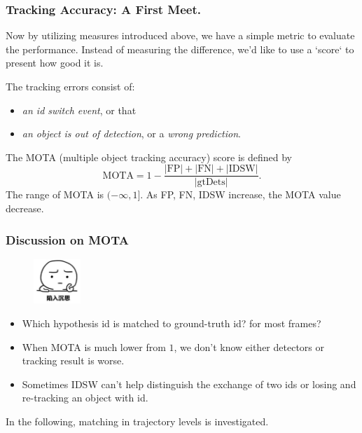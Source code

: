 \documentclass[slidetop, mathserif]{beamer}
\begin{document}
\begin{frame}
	\frametitle{Tracking Accuracy: A First Meet.}

	Now by utilizing measures introduced above,
	we have a simple metric to evaluate the performance.
	Instead of measuring the difference,
	we'd like to use a `score` to present how good it is.

	\vspace{3pt}

	The tracking errors consist of:
	\begin{itemize}
	\item \emph{an id switch event}, or that
	\item \emph{an object is out of detection}, or a \emph{wrong prediction}.
	\end{itemize}

	The MOTA (multiple object tracking accuracy) score is defined by
	\[
		\text{MOTA} = 1 - \dfrac{|\text{FP}| + |\text{FN}| + |\text{IDSW}|}{|\text{gtDets}|}.
	\]
	The range of MOTA is $(-\infty,1]$. As FP, FN, IDSW increase, the MOTA value decrease.

\end{frame}


\begin{frame}
	\frametitle{Discussion on MOTA}

	\begin{minipage}{50pt}
		\begin{figure}
			\includegraphics[width=50pt]{pics/question2.png}
		\end{figure}
	\end{minipage}
	\begin{minipage}{250pt}
	\begin{itemize}
	\item Which hypothesis id is matched to ground-truth id? for most frames?
	\item When MOTA is much lower from $1$, we don't know either detectors or tracking result is worse.
	\item Sometimes IDSW can't help distinguish the exchange of two ids or
		losing and re-tracking an object with id.
	\end{itemize}
	\end{minipage}

	\vspace{10pt}

	In the following, matching in trajectory levels is investigated.

\end{frame}
\end{document}
